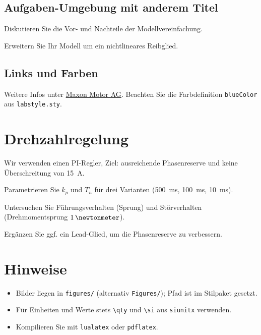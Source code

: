 \documentclass[a4paper,11pt]{scrartcl}
\begin{document}
\subsection*{Aufgaben-Umgebung mit anderem Titel}
\begin{aufgaben}[Zusatzaufgaben]
    \item Diskutieren Sie die Vor- und Nachteile der Modellvereinfachung.
    \item Erweitern Sie Ihr Modell um ein nichtlineares Reibglied.
\end{aufgaben}

\subsection*{Links und Farben}
Weitere Infos unter
\href{https://www.maxongroup.com/}{\color{blueColor}Maxon Motor AG}.
Beachten Sie die Farbdefinition \texttt{blueColor} aus \texttt{labstyle.sty}.

\section{Drehzahlregelung}
Wir verwenden einen PI-Regler, Ziel: ausreichende Phasenreserve und keine Überschreitung von \qty{15}{A}.

\begin{aufgaben}
    \item Parametrieren Sie \(k_p\) und \(T_n\) für drei Varianten (\qty{500}{ms}, \qty{100}{ms}, \qty{10}{ms}).
    \item Untersuchen Sie Führungsverhalten (Sprung) und Störverhalten (Drehmomentsprung \(\qty{1}{\newtonmeter}\)).
    \item Ergänzen Sie ggf. ein Lead-Glied, um die Phasenreserve zu verbessern.
\end{aufgaben}

\section*{Hinweise}
\begin{itemize}
    \item Bilder liegen in \texttt{figures/} (alternativ \texttt{Figures/}); Pfad ist im Stilpaket gesetzt.
    \item Für Einheiten und Werte stets \verb|\qty| und \verb|\si| aus \texttt{siunitx} verwenden.
    \item Kompilieren Sie mit \texttt{lualatex} oder \texttt{pdflatex}.
\end{itemize}
\end{document}
